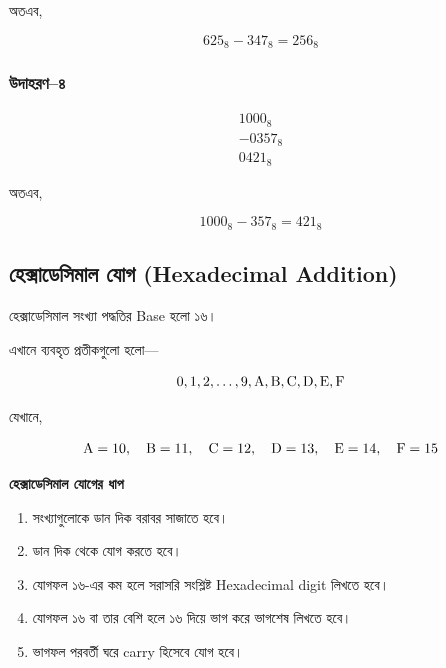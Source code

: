অতএব,

\[
\boxed{625_8-347_8=256_8}
\]

\subsubsection*{উদাহরণ--৪}

\[
\begin{array}{r}
1000_8\\
-0357_8\\
\hline
0421_8
\end{array}
\]

অতএব,

\[
\boxed{1000_8-357_8=421_8}
\]


\subsection{হেক্সাডেসিমাল যোগ
(\textenglish{Hexadecimal Addition})}

হেক্সাডেসিমাল সংখ্যা পদ্ধতির
\textenglish{Base} হলো ১৬।

এখানে ব্যবহৃত প্রতীকগুলো হলো—

\[
0,1,2,\ldots,9,
\text{\textenglish{A}},
\text{\textenglish{B}},
\text{\textenglish{C}},
\text{\textenglish{D}},
\text{\textenglish{E}},
\text{\textenglish{F}}
\]

যেখানে,

\[
\text{\textenglish{A}}=10,\quad
\text{\textenglish{B}}=11,\quad
\text{\textenglish{C}}=12,\quad
\text{\textenglish{D}}=13,\quad
\text{\textenglish{E}}=14,\quad
\text{\textenglish{F}}=15
\]

\par\begingroup

\textbf{হেক্সাডেসিমাল যোগের ধাপ}

\begin{enumerate}
    \item সংখ্যাগুলোকে ডান দিক বরাবর সাজাতে হবে।
    \item ডান দিক থেকে যোগ করতে হবে।
    \item যোগফল ১৬-এর কম হলে সরাসরি সংশ্লিষ্ট
    \textenglish{Hexadecimal digit} লিখতে হবে।
    \item যোগফল ১৬ বা তার বেশি হলে ১৬ দিয়ে ভাগ করে
    ভাগশেষ লিখতে হবে।
    \item ভাগফল পরবর্তী ঘরে
    \textenglish{carry} হিসেবে যোগ হবে।
\end{enumerate}
\par\endgroup


